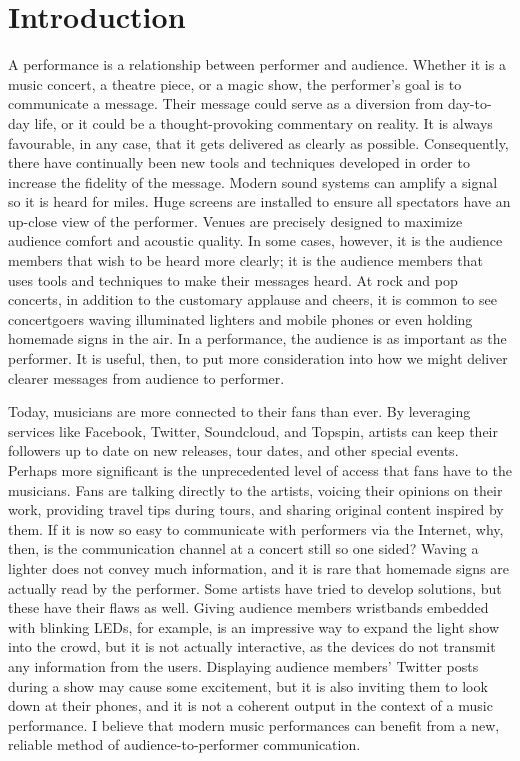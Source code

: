 \chapter{Introduction}

A performance is a relationship between performer and audience. Whether it is a music concert, a theatre piece, or a magic show, the performer's goal is to communicate a message. Their message could serve as a diversion from day-to-day life, or it could be a thought-provoking commentary on reality. It is always favourable, in any case, that it gets delivered as clearly as possible. Consequently, there have continually been new tools and techniques developed in order to increase the fidelity of the message. Modern sound systems can amplify a signal so it is heard for miles. Huge screens are installed to ensure all spectators have an up-close view of the performer. Venues are precisely designed to maximize audience comfort and acoustic quality. In some cases, however, it is the audience members that wish to be heard more clearly; it is the audience members that uses tools and techniques to make their messages heard. At rock and pop concerts, in addition to the customary applause and cheers, it is common to see concertgoers waving illuminated lighters and mobile phones or even holding homemade signs in the air. In a performance, the audience is as important as the performer. It is useful, then, to put more consideration into how we might deliver clearer messages from audience to performer.

Today, musicians are more connected to their fans than ever. By leveraging services like Facebook, Twitter, Soundcloud, and Topspin, artists can keep their followers up to date on new releases, tour dates, and other special events. Perhaps more significant is the unprecedented level of access that fans have to the musicians. Fans are talking directly to the artists, voicing their opinions on their work, providing travel tips during tours, and sharing original content inspired by them. If it is now so easy to communicate with performers via the Internet, why, then, is the communication channel at a concert still so one sided? Waving a lighter does not convey much information, and it is rare that homemade signs are actually read by the performer. Some artists have tried to develop solutions, but these have their flaws as well. Giving audience members wristbands embedded with blinking LEDs, for example, is an impressive way to expand the light show into the crowd, but it is not actually interactive, as the devices do not transmit any information from the users. Displaying audience members' Twitter posts during a show may cause some excitement, but it is also inviting them to look down at their phones, and it is not a coherent output in the context of a music performance. I believe that modern music performances can benefit from a new, reliable method of audience-to-performer communication.

